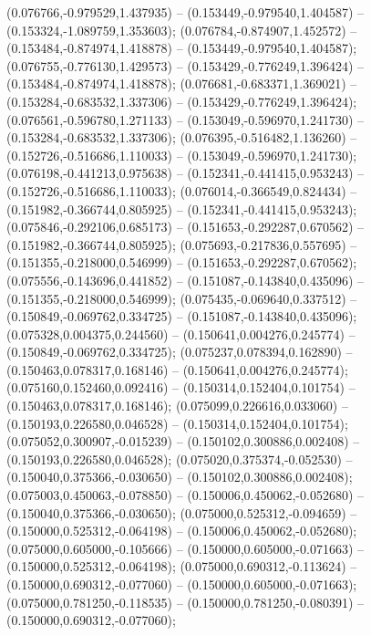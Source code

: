  (0.076766,-0.979529,1.437935) -- (0.153449,-0.979540,1.404587) -- (0.153324,-1.089759,1.353603);
 (0.076784,-0.874907,1.452572) -- (0.153484,-0.874974,1.418878) -- (0.153449,-0.979540,1.404587);
 (0.076755,-0.776130,1.429573) -- (0.153429,-0.776249,1.396424) -- (0.153484,-0.874974,1.418878);
 (0.076681,-0.683371,1.369021) -- (0.153284,-0.683532,1.337306) -- (0.153429,-0.776249,1.396424);
 (0.076561,-0.596780,1.271133) -- (0.153049,-0.596970,1.241730) -- (0.153284,-0.683532,1.337306);
 (0.076395,-0.516482,1.136260) -- (0.152726,-0.516686,1.110033) -- (0.153049,-0.596970,1.241730);
 (0.076198,-0.441213,0.975638) -- (0.152341,-0.441415,0.953243) -- (0.152726,-0.516686,1.110033);
 (0.076014,-0.366549,0.824434) -- (0.151982,-0.366744,0.805925) -- (0.152341,-0.441415,0.953243);
 (0.075846,-0.292106,0.685173) -- (0.151653,-0.292287,0.670562) -- (0.151982,-0.366744,0.805925);
 (0.075693,-0.217836,0.557695) -- (0.151355,-0.218000,0.546999) -- (0.151653,-0.292287,0.670562);
 (0.075556,-0.143696,0.441852) -- (0.151087,-0.143840,0.435096) -- (0.151355,-0.218000,0.546999);
 (0.075435,-0.069640,0.337512) -- (0.150849,-0.069762,0.334725) -- (0.151087,-0.143840,0.435096);
 (0.075328,0.004375,0.244560) -- (0.150641,0.004276,0.245774) -- (0.150849,-0.069762,0.334725);
 (0.075237,0.078394,0.162890) -- (0.150463,0.078317,0.168146) -- (0.150641,0.004276,0.245774);
 (0.075160,0.152460,0.092416) -- (0.150314,0.152404,0.101754) -- (0.150463,0.078317,0.168146);
 (0.075099,0.226616,0.033060) -- (0.150193,0.226580,0.046528) -- (0.150314,0.152404,0.101754);
 (0.075052,0.300907,-0.015239) -- (0.150102,0.300886,0.002408) -- (0.150193,0.226580,0.046528);
 (0.075020,0.375374,-0.052530) -- (0.150040,0.375366,-0.030650) -- (0.150102,0.300886,0.002408);
 (0.075003,0.450063,-0.078850) -- (0.150006,0.450062,-0.052680) -- (0.150040,0.375366,-0.030650);
 (0.075000,0.525312,-0.094659) -- (0.150000,0.525312,-0.064198) -- (0.150006,0.450062,-0.052680);
 (0.075000,0.605000,-0.105666) -- (0.150000,0.605000,-0.071663) -- (0.150000,0.525312,-0.064198);
 (0.075000,0.690312,-0.113624) -- (0.150000,0.690312,-0.077060) -- (0.150000,0.605000,-0.071663);
 (0.075000,0.781250,-0.118535) -- (0.150000,0.781250,-0.080391) -- (0.150000,0.690312,-0.077060);
